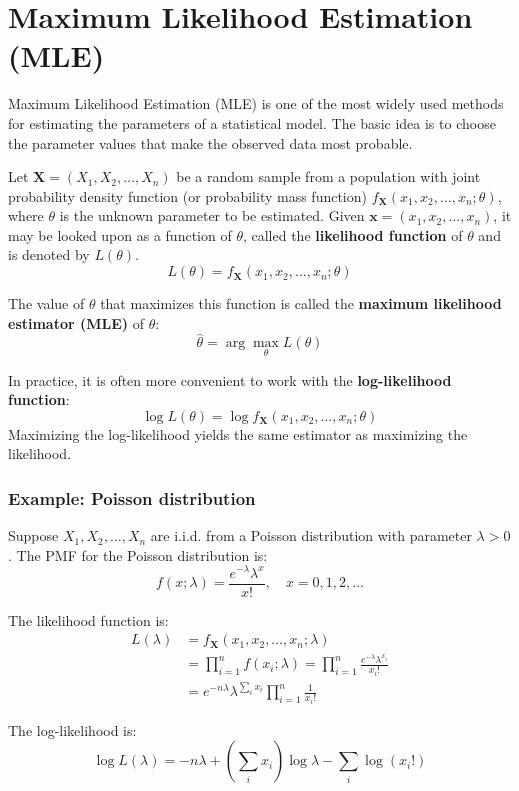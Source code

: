 \documentclass[twoside]{book}
\begin{document}
\section{Maximum Likelihood Estimation (MLE)}

{Maximum Likelihood Estimation (MLE)} is one of the most widely used methods for estimating the parameters of a statistical model. The basic idea is to choose the parameter values that make the observed data most probable.

Let \(\textbf{X} = ( X_1, X_2, \dots, X_n) \) be a random sample from a population with joint probability density function (or probability mass function) \( f_{\textbf{X}}(x_1, x_2, \dots, x_n ; \theta) \), where \( \theta \) is the unknown parameter to be estimated. Given $\textbf{x} = (x_1, x_2, \dots, x_n)$, it may be looked upon as a function of $\theta$, called the \textbf{likelihood function} of $\theta$ and is denoted by $L(\theta)$.
\[
L(\theta) = f_{\textbf{X}}(x_1, x_2, \dots, x_n ; \theta)
\]

The value of \( \theta \) that maximizes this function is called the \textbf{maximum likelihood estimator (MLE)} of \( \theta \):
\[
\hat{\theta} = \arg\max_{\theta} L(\theta)
\]

In practice, it is often more convenient to work with the \textbf{log-likelihood function}:
\[
\log L(\theta) = \log f_{\textbf{X}}(x_1, x_2, \dots, x_n ; \theta)
\]
Maximizing the log-likelihood yields the same estimator as maximizing the likelihood.

\subsubsection*{Example: Poisson distribution}

Suppose \( X_1, X_2, \dots, X_n \) are i.i.d. from a Poisson distribution with parameter \( \lambda > 0 \). The PMF for the Poisson distribution is:
\[
f(x; \lambda) = \frac{e^{-\lambda} \lambda^x}{x!}, \quad x = 0, 1, 2, \dots
\]

The likelihood function is:
\begin{align*}
L(\lambda) &= f_{\textbf{X}}(x_1, x_2, \dots, x_n ; \lambda)\\
&= \prod_{i=1}^n f(x_i ; \lambda) = \prod_{i=1}^n \frac{e^{-\lambda} \lambda^{x_i}}{x_i!} \\
&= e^{-n\lambda} \lambda^{\sum_i x_i} \prod_{i=1}^n \frac{1}{x_i!}
\end{align*}

The log-likelihood is:
\[
\log L(\lambda) = -n\lambda + \left(\sum_i x_i\right) \log \lambda - \sum_i \log(x_i!)
\]
\end{document}
